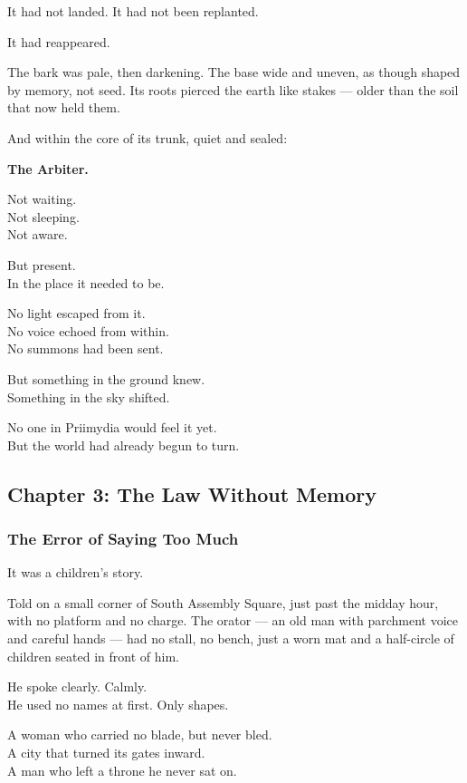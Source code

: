 \documentclass[12pt]{article}
\begin{document}
It had not landed. It had not been replanted.

It had reappeared.

The bark was pale, then darkening. The base wide and uneven, as though shaped by memory, not seed. Its roots pierced the earth like stakes --- older than the soil that now held them.

And within the core of its trunk, quiet and sealed:

\textbf{The Arbiter.}

Not waiting.\\
Not sleeping.\\
Not aware.

But present.\\
In the place it needed to be.

No light escaped from it.\\
No voice echoed from within.\\
No summons had been sent.

But something in the ground knew.\\
Something in the sky shifted.

No one in Priimydia would feel it yet.\\
But the world had already begun to turn.

\newpage

\subsection{Chapter 3: The Law Without Memory}

\vspace{.5in}

\subsubsection{The Error of Saying Too Much}

It was a children’s story.

Told on a small corner of South Assembly Square, just past the midday hour, with no platform and no charge. The orator --- an old man with parchment voice and careful hands --- had no stall, no bench, just a worn mat and a half-circle of children seated in front of him.

He spoke clearly. Calmly.\\
He used no names at first. Only shapes.

A woman who carried no blade, but never bled.\\
A city that turned its gates inward.\\
A man who left a throne he never sat on.
\end{document}
